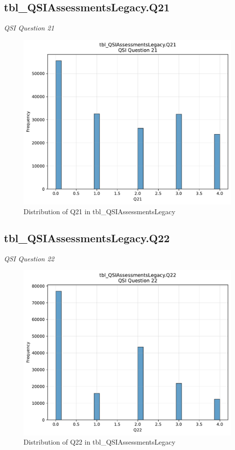 \subsection{tbl\_QSIAssessmentsLegacy.Q21}
\textit{QSI Question 21}

\begin{figure}[htbp]
\centering
\includegraphics[width=\textwidth]{figures/dbo_tbl_QSIAssessmentsLegacy_Q21.pdf}
\caption{Distribution of Q21 in tbl\_QSIAssessmentsLegacy}
\end{figure}\newpage

\subsection{tbl\_QSIAssessmentsLegacy.Q22}
\textit{QSI Question 22}

\begin{figure}[htbp]
\centering
\includegraphics[width=\textwidth]{figures/dbo_tbl_QSIAssessmentsLegacy_Q22.pdf}
\caption{Distribution of Q22 in tbl\_QSIAssessmentsLegacy}
\end{figure}\newpage

